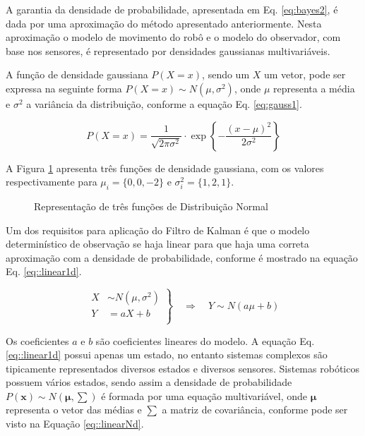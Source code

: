 A garantia da densidade de probabilidade, apresentada em Eq. \ref{eq:bayes2}, é dada por uma aproximação do método apresentado anteriormente. Nesta aproximação o modelo de movimento do robô e o modelo do observador, com base nos sensores, é representado por densidades gaussianas multivariáveis.

A função de densidade gaussiana $P(X = x)$, sendo um $X$ um vetor, pode ser expressa na seguinte forma ${P(X = x) \sim N(\mu, \sigma^2)}$, onde $\mu$ representa a média e $\sigma^2$ a variância da distribuição, conforme a equação Eq. \ref{eq:gauss1}.

\begin{equation}
    \label{eq:gauss1}
    P(X = x) = \dfrac{1}{\sqrt{2\pi\sigma^2}}\cdot 
    \exp\left\{-\frac{(x-\mu)^2}{2\sigma^2}\right\}
\end{equation}

A Figura \ref{fig::gauss1} apresenta três funções de densidade gaussiana, com os valores respectivamente para $\mu_i = \{0,0,-2\}$ e $\sigma^2_i = \{1,2,1\}$.


\begin{figure}[!ht]
    \centering
    
    \caption{Representação de três funções de Distribuição Normal}
    \label{fig::gauss1}
\end{figure}

Um dos requisitos para aplicação do Filtro de Kalman é que o modelo determinístico de observação se haja linear para que haja uma correta aproximação com a densidade de probabilidade, conforme é mostrado na equação Eq. \ref{eq::linear1d}.


\begin{equation}
    \label{eq::linear1d}
    \left.
    \begin{aligned}
            X & \sim N\left(\mu, \sigma^2\right)\\
            Y & = aX + b\\
    \end{aligned} \right\}
    \quad \Rightarrow \quad Y \sim N\left(a\mu+b\right)
\end{equation}

Os coeficientes $a$ e $b$ são coeficientes lineares do modelo. A equação Eq. \ref{eq::linear1d} possui apenas um estado, no entanto sistemas complexos são tipicamente representados diversos estados e diversos sensores.
Sistemas robóticos possuem vários estados, sendo assim a densidade de probabilidade ${P(\mathbf{x}) \sim N(\boldsymbol{\mu}, \textstyle\sum)}$ é formada por uma equação multivariável, onde $\boldsymbol{\mu}$ representa o vetor das médias e ${\textstyle\sum}$ a matriz de covariância, conforme pode ser visto na Equação \ref{eq::linearNd}.

